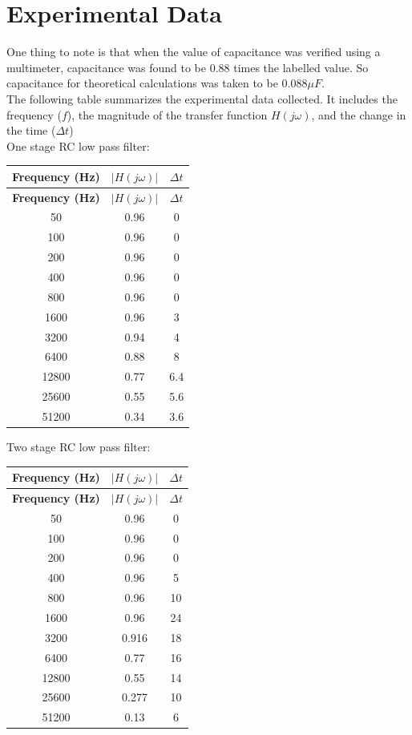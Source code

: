 \documentclass[a4paper,12pt]{article}
\begin{document}
\section{Experimental Data}
One thing to note is that when the value of capacitance was verified using a multimeter, capacitance was found to be $0.88$ times the labelled value. So capacitance for theoretical calculations was taken to be $0.088 \mu F$. \\
The following table summarizes the experimental data collected. It includes the frequency ($f$), the magnitude of the transfer function $H(j\omega)$, and the change in the time ($\Delta t$)\\
One stage RC low pass filter:\\
\begin{longtable}{|c|c|c|}
\hline
\textbf{Frequency (Hz)} & \textbf{$|H(j\omega)|$} & \textbf{$\Delta t$} \\
\hline
\endfirsthead
\hline
\textbf{Frequency (Hz)} & \textbf{$|H(j\omega)|$} & \textbf{$\Delta t$} \\
\hline
\endhead
\hline
\endfoot
\hline
\endlastfoot
50 & 0.96 & 0 \\
100 & 0.96 & 0 \\
200 & 0.96 & 0 \\
400 & 0.96 & 0 \\
800 & 0.96 & 0 \\
1600 & 0.96 & 3 \\
3200 & 0.94 & 4 \\
6400 & 0.88 & 8 \\
12800 & 0.77 & 6.4 \\
25600 & 0.55 & 5.6 \\
51200 & 0.34 & 3.6 \\
\end{longtable}
\pagebreak
Two stage RC low pass filter:\\
\begin{longtable}{|c|c|c|}
\hline
\textbf{Frequency (Hz)} & \textbf{$|H(j\omega)|$} & \textbf{$\Delta t$} \\
\hline
\endfirsthead
\hline
\textbf{Frequency (Hz)} & \textbf{$|H(j\omega)|$} & \textbf{$\Delta t$} \\
\hline
\endhead
\hline
\endfoot
\hline
\endlastfoot
50 & 0.96 & 0 \\
100 & 0.96 & 0 \\
200 & 0.96 & 0 \\
400 & 0.96 & 5 \\
800 & 0.96 & 10 \\
1600 & 0.96 & 24 \\
3200 & 0.916 & 18 \\
6400 & 0.77 & 16 \\
12800 & 0.55 & 14 \\
25600 & 0.277 & 10 \\
51200 & 0.13 & 6 \\
\end{longtable}
\end{document}

